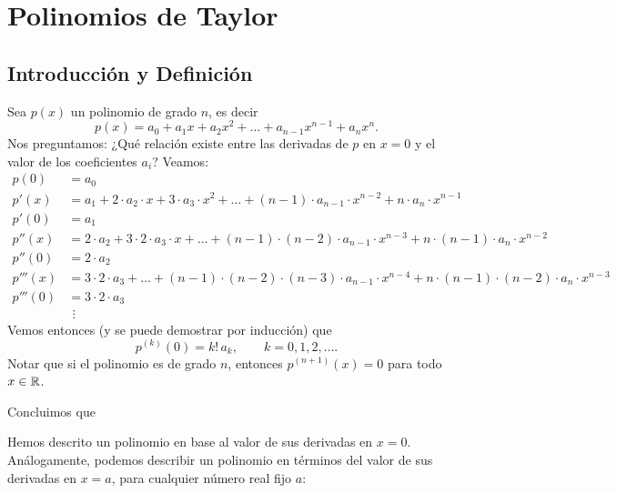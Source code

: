 
\chapter{Polinomios de Taylor}



\section{Introducción y Definición}

Sea $p(x)$ un polinomio de grado $n$, es decir
\[
 p(x) = a_0 + a_1 x + a_2 x^2 + \dots + a_{n-1} x^{n-1} + a_n x^n.
\]
Nos preguntamos: ¿Qué relación existe entre las derivadas de $p$ en $x = 0$ y el valor de los coeficientes $a_i$?
Veamos:
\begin{align*}
 p(0)   &= a_0 \\
 p'(x)  &= a_1 + 2 \cdot a_2 \cdot x + 3 \cdot a_3 \cdot x^2 + \dots + (n-1) \cdot a_{n-1} \cdot x^{n-2} + n \cdot a_n \cdot x^{n-1} \\
 p'(0)  &= a_1 \\
 p''(x) &= 2 \cdot a_2 + 3 \cdot 2 \cdot a_3 \cdot x + \dots + (n-1) \cdot (n-2) \cdot a_{n-1} \cdot x^{n-3} + n \cdot (n-1) \cdot a_n \cdot x^{n-2} \\
 p''(0) &= 2 \cdot a_2 \\
 p'''(x) &= 3\cdot 2 \cdot a_3 + \dots + (n-1) \cdot (n-2) \cdot (n-3) \cdot a_{n-1} \cdot x^{n-4} + n \cdot (n-1) \cdot (n-2) \cdot a_n \cdot x^{n-3} \\
 p'''(0) &= 3 \cdot 2 \cdot a_3 \\
&\ \,\vdots
\end{align*}
Vemos entonces (y se puede demostrar por inducción) que
\[
 p^{(k)} (0) = k! \, a_k,\qquad k=0,1,2,\dots.
\]
Notar que si el polinomio es de grado $n$, entonces $p^{(n+1)}(x) = 0$ para todo $x \in \mathbb{R}$.

Concluimos que


Hemos descrito un polinomio en base al valor de sus derivadas en $x=0$.
Análogamente, podemos describir un polinomio en términos del valor de sus derivadas en $x=a$, para cualquier número real fijo $a$:


